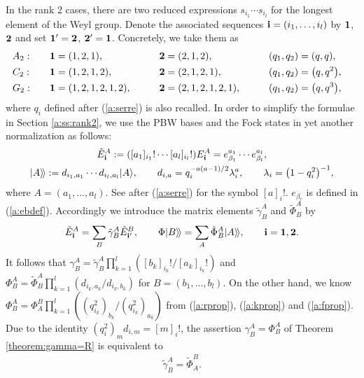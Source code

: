 \documentclass[pdftex]{sigma}
\begin{document}
In the rank 2 cases,
there are two reduced expressions
$s_{i_1}\cdots s_{i_l}$ for the longest element of the
Weyl group.
Denote the associated sequences
${\bf i} = (i_1,\ldots, i_l)$  by ${\bf 1}$, ${\bf 2}$  and
set ${\bf 1}' = {\bf 2}$, ${\bf 2}' = {\bf 1}$.
Concretely, we take them as
\begin{alignat*}{5}
& A_2:  \quad && {\bf 1}=(1,2,1),\qquad &&{\bf 2}=(2,1,2), \qquad &&(q_1,q_2)=(q,q),& \\
& C_2: \quad && {\bf 1}=(1,2,1,2),\qquad &&{\bf 2}=(2,1,2,1), \qquad &&(q_1,q_2)=\big(q,q^2\big),& \\
& G_2: \quad && {\bf 1}=(1,2,1,2,1,2),\qquad &&{\bf 2}=(2,1,2,1,2,1), \qquad &&(q_1,q_2)=\big(q,q^3\big),&
\end{alignat*}
where $q_i$ def\/ined after (\ref{a:serre}) is also recalled.
In order to simplify the formulae in
Section \ref{a:ss:rank2}, we use the PBW bases and the
Fock states in yet another normalization as follows:
\begin{gather}
{\tilde E}^A_{\bf i}  := ([a_1]_{i_1}!\cdots [a_l]_{i_l}!) E^A_{\bf i}
= e^{a_1}_{\beta_1}\cdots e^{a_l}_{\beta_l}, \nonumber\\
|A\rangle\!\rangle  := d_{i_1,a_1}\cdots d_{i_l,a_l}|A\rangle,\qquad
d_{i,a} = q^{-a(a-1)/2}_i\lambda^a_i,\qquad
\lambda_i = \big(1-q_i^2\big)^{-1},\label{a:kett}
\end{gather}
where $A=(a_1,\ldots, a_l)$.
See after (\ref{a:serre}) for the symbol $[a]_i!$.
$e_{\beta_r}$ is def\/ined in (\ref{a:ebdef}).
Accordingly we introduce the matrix elements ${\tilde \gamma}^A_B$ and
${\tilde \Phi}^A_B$ by
\begin{gather*}
{\tilde E}^A_{\bf i} =\sum_B {\tilde \gamma}^A_B
{\tilde E}^B_{{\bf i}'},\qquad
\Phi |B\rangle\!\rangle=\sum_A {\tilde \Phi}^A_B |A\rangle\!\rangle,
\qquad {\bf i}={\bf 1}, {\bf 2}.
\end{gather*}
It follows that
$\gamma^A_B =
{\tilde \gamma}^A_B\prod\limits_{k=1}^l([b_k]_{i_k}!/[a_k]_{i_k}!)$
and
$\Phi^A_B=
{\tilde \Phi}^A_B\prod\limits_{k=1}^l(d_{i_k,a_k}/d_{i_k,b_k})$
for $B=(b_1,\ldots, b_l)$.
On the other hand, we know
$\Phi^A_B=\Phi^B_A\prod\limits_{k=1}^l((q_{i_k}^2)_{b_k}/(q_{i_k}^2)_{a_k})$
from (\ref{a:rprop}), (\ref{a:kprop}) and (\ref{a:fprop}).
Due to the identity
$(q_i^2)_md_{i,m}=[m]_i!$,
the assertion $\gamma^A_B=\Phi^A_B$
of Theorem \ref{theorem:gamma=R} is equivalent to
\begin{gather}\label{a:gyaku}
{\tilde \gamma}^A_B={\tilde \Phi^B_A}.
\end{gather}
\end{document}
